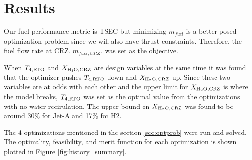 \documentclass[conf]{new-aiaa}
\begin{document}

\section{Results}
\label{sec:results}

Our fuel performance metric is TSEC but minimizing $\dot{m}_{fuel}$ is a better posed optimization problem since we will also have thrust constraints.
Therefore, the fuel flow rate at CRZ, $\dot{m}_{fuel,CRZ}$, was set as the objective.

When $T_{4,\rm{RTO}}$ and $X_{\rm{H_2O,CRZ}}$ are design variables at the same time it was found that the optimizer pushes $T_{4,\rm{RTO}}$ down and $X_{\rm{H_2O,CRZ}}$ up.
Since these two variables are at odds with each other and the upper limit for $X_{\rm{H_2O,CRZ}}$ is where the model breaks, $T_{4,\rm{RTO}}$ was set as the optimal value from the optimizations with no water recirulation.
The upper bound on $X_{\rm{H_2O,CRZ}}$ was found to be around 30\% for Jet-A and 17\% for H2.

The 4 optimizations mentioned in the section \ref{sec:optprob} were run and solved.
The optimality, feasibility, and merit function for each optimization is shown plotted in Figure \ref{fig:history_summary}.
\end{document}
